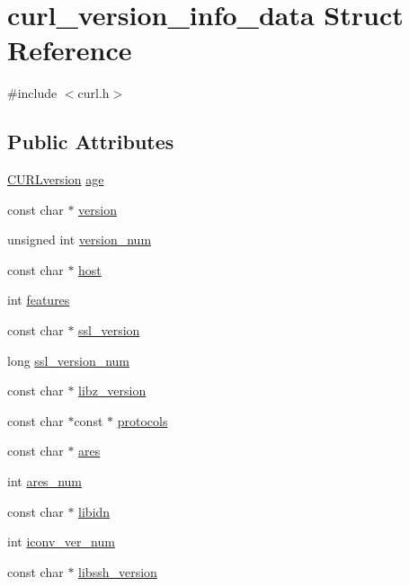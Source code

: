 \hypertarget{structcurl__version__info__data}{}\section{curl\+\_\+version\+\_\+info\+\_\+data Struct Reference}
\label{structcurl__version__info__data}


{\ttfamily \#include $<$curl.\+h$>$}

\subsection*{Public Attributes}
\begin{DoxyCompactItemize}
\item 
\hyperlink{curl_8h_a5354571aaeb1637cb595ab4515ec15fe}{C\+U\+R\+Lversion} \hyperlink{structcurl__version__info__data_adfe72a24d6f7ab569ea8d5cdc354f5b1}{age}
\item 
const char $\ast$ \hyperlink{structcurl__version__info__data_aaa34d7e958e6f35cde0a03380e12c201}{version}
\item 
unsigned int \hyperlink{structcurl__version__info__data_a4afdf4d9449422e8741959683dd47985}{version\+\_\+num}
\item 
const char $\ast$ \hyperlink{structcurl__version__info__data_a9f2ea78b3fb7d2acd2a9c538ae36bc35}{host}
\item 
int \hyperlink{structcurl__version__info__data_ac2385fd807dd20c4c9ac67b397034e27}{features}
\item 
const char $\ast$ \hyperlink{structcurl__version__info__data_ac44ab02c734e3808b46ebdba1febf16b}{ssl\+\_\+version}
\item 
long \hyperlink{structcurl__version__info__data_af732cc5f45e3df97e73160118ee7abf2}{ssl\+\_\+version\+\_\+num}
\item 
const char $\ast$ \hyperlink{structcurl__version__info__data_af957e0bca22f36674d392657c32363e0}{libz\+\_\+version}
\item 
const char $\ast$const $\ast$ \hyperlink{structcurl__version__info__data_a09b7d25d153b907d52b788c66cef5cd3}{protocols}
\item 
const char $\ast$ \hyperlink{structcurl__version__info__data_ad99ab123ae1d98cbf46228297001fe58}{ares}
\item 
int \hyperlink{structcurl__version__info__data_a6634337e6a73a5619aea6ad0d5d9837e}{ares\+\_\+num}
\item 
const char $\ast$ \hyperlink{structcurl__version__info__data_afa8789779d0c2b3540fc2b64ef9a182e}{libidn}
\item 
int \hyperlink{structcurl__version__info__data_a17a8113033d8700eff033566f410065e}{iconv\+\_\+ver\+\_\+num}
\item 
const char $\ast$ \hyperlink{structcurl__version__info__data_a1edd5dccd4f769a8a223da63762b9bac}{libssh\+\_\+version}
\end{DoxyCompactItemize}


